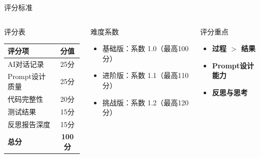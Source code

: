 \begin{frame}{评分标准}
	\begin{columns}
		\begin{block}{评分表}
			\begin{table}
				\centering
				\small
				\begin{tabular}{lc}
					\toprule
					\textbf{评分项} & \textbf{分值} \\
					\midrule
					AI对话记录 & 25分 \\
					Prompt设计质量 & 25分 \\
					代码完整性 & 20分 \\
					测试结果 & 15分 \\
					反思报告深度 & 15分 \\
					\midrule
					\textbf{总分} & \textbf{100分} \\
					\bottomrule
				\end{tabular}
			\end{table}
		\end{block}

		\begin{block}{难度系数}
			\begin{itemize}
				\item 基础版：系数 1.0（最高100分）
				\item 进阶版：系数 1.1（最高110分）
				\item 挑战版：系数 1.2（最高120分）
			\end{itemize}
		\end{block}

		\vspace{0.3cm}

		\begin{alertblock}{评分重点}
			\begin{itemize}
				\item \textbf{过程 $>$ 结果}
				\item \textbf{Prompt设计能力}
				\item \textbf{反思与思考}
			\end{itemize}
		\end{alertblock}
	\end{columns}
\end{frame}


